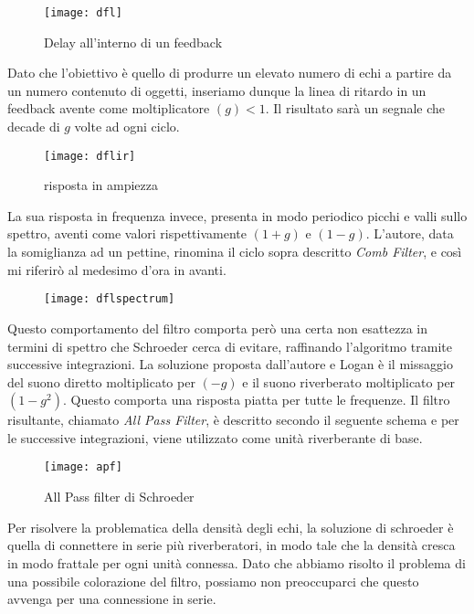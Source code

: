 \begin{figure}[htp]
\centering
\texttt{[image: dfl]}
\caption{Delay all'interno di un feedback}
\label{fig:dfl}
\end{figure}

Dato che l'obiettivo è quello di produrre un elevato numero di echi a partire da un numero contenuto di oggetti, inseriamo dunque la linea di ritardo in un feedback avente come moltiplicatore $(g) < 1$.
Il risultato sarà un segnale che decade di $g$ volte ad ogni ciclo.

\begin{figure}[htp]
\centering
\texttt{[image: dflir]}
\caption{risposta in ampiezza}
\label{fig:dflir}
\end{figure}

La sua risposta in frequenza invece, presenta in modo periodico picchi e valli sullo spettro, aventi come valori rispettivamente $(1+g)$ e $(1-g)$. L’autore, data la somiglianza ad un pettine, rinomina il ciclo sopra descritto \emph{Comb Filter}, e così mi riferirò al medesimo d’ora in avanti.

\begin{figure}[htp]
\centering
\texttt{[image: dflspectrum]}
\caption{}
\label{fig:dflspectrum}
\end{figure}

Questo comportamento del filtro comporta però una certa non esattezza in termini di spettro che Schroeder cerca di evitare, raffinando l’algoritmo tramite successive integrazioni.
La soluzione proposta dall’autore e Logan è il missaggio del suono diretto moltiplicato per $(-g)$ e il suono riverberato moltiplicato per $(1-g^2)$. Questo comporta una risposta piatta per tutte le frequenze. Il filtro risultante, chiamato \emph{All Pass Filter}, è descritto secondo il seguente schema e per le successive integrazioni, viene utilizzato come unità riverberante di base.

\begin{figure}[htp]
\centering
\texttt{[image: apf]}
\caption{All Pass filter di Schroeder}
\label{fig:apf}
\end{figure}

Per risolvere la problematica della densità degli echi, la soluzione di schroeder è quella di connettere in serie più riverberatori, in modo tale che la densità cresca in modo frattale per ogni unità connessa. Dato che abbiamo risolto il problema di una possibile colorazione del filtro, possiamo non preoccuparci che questo avvenga per una connessione in serie.

